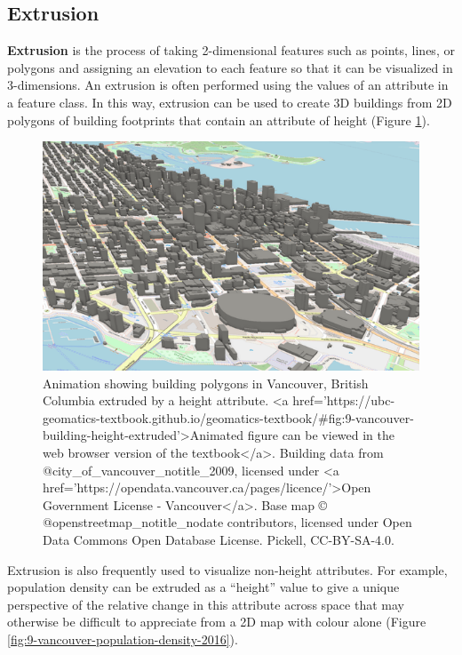 \documentclass[
]{book}
\begin{document}
\hypertarget{extrusion}{%
\subsection{Extrusion}\label{extrusion}}

\textbf{Extrusion} is the process of taking 2-dimensional features such as points, lines, or polygons and assigning an elevation to each feature so that it can be visualized in 3-dimensions. An extrusion is often performed using the values of an attribute in a feature class. In this way, extrusion can be used to create 3D buildings from 2D polygons of building footprints that contain an attribute of height (Figure \ref{fig:9-vancouver-building-height-extruded}).

\begin{figure}
\includegraphics[width=0.75\linewidth]{images/09-vancouver-building-height-extruded} \caption{Animation showing building polygons in Vancouver, British Columbia extruded by a height attribute. <a href='https://ubc-geomatics-textbook.github.io/geomatics-textbook/#fig:9-vancouver-building-height-extruded'>Animated figure can be viewed in the web browser version of the textbook</a>. Building data from @city_of_vancouver_notitle_2009, licensed under <a href='https://opendata.vancouver.ca/pages/licence/'>Open Government License - Vancouver</a>. Base map © @openstreetmap_notitle_nodate contributors, licensed under Open Data Commons Open Database License. Pickell, CC-BY-SA-4.0.}\label{fig:9-vancouver-building-height-extruded}
\end{figure}

Extrusion is also frequently used to visualize non-height attributes. For example, population density can be extruded as a ``height'' value to give a unique perspective of the relative change in this attribute across space that may otherwise be difficult to appreciate from a 2D map with colour alone (Figure \ref{fig:9-vancouver-population-density-2016}).
\end{document}

